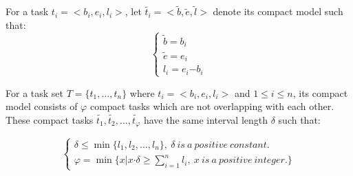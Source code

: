 \documentclass[prodmode,acmtosn]{acmsmall}
\begin{document}
\begin{definition}
For a task $t_i\mathrm{=<}b_i,e_i,l_i\mathrm{>}$, let $\widetilde{t_i}\mathrm{=<}\widetilde{b},\widetilde{e},\widetilde{l}>$ denote its compact model such that:
\begin{equation}
\left\{ \begin{array}{ll}
\widetilde{b} = b_i\\
\widetilde{e} = e_i\\
l_i = e_i\mathrm{-}b_i
\end{array} \right.
\end{equation}
\end{definition}

\begin{definition}
For a task set $T\mathrm{=}\{t_1,...,t_n\}$ where $t_i\mathrm{=<}b_i,e_i,l_i\mathrm{>}$ and $1\mathrm{\le} i\mathrm{\le} n$, its compact model consists of $\varphi$ compact tasks which are not overlapping with each other. These compact tasks $\widetilde{t_1}, \widetilde{t_2}, ..., \widetilde{t_\varphi}$ have the same interval length $\delta$ such that:

\begin{equation}
\left\{ \begin{array}{ll}
\delta \le \min\{l_1,l_2,...,l_n\}, \ \delta \ is \ a \ positive \ constant.\\
\varphi=\min\{x|x\mathrm{\cdot}\delta\mathrm{\ge} \sum_{i\mathrm{=}1}^{n}l_i,\ x\ is\ a\ positive\ integer.\}
\end{array} \right.
\end{equation}
\end{definition}
\end{document}
